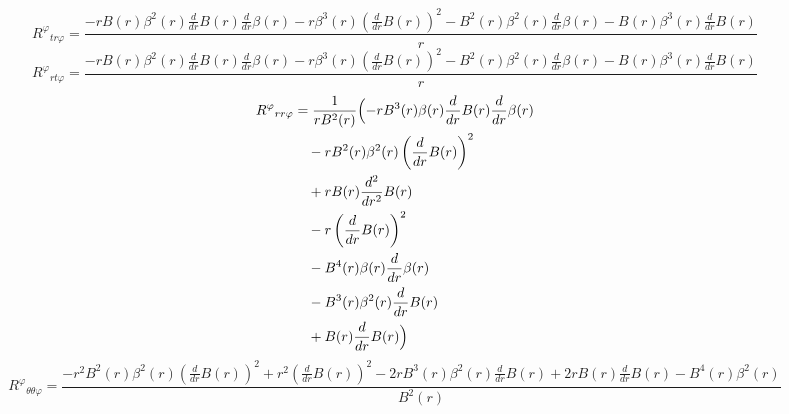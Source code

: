 \documentclass[11pt,a4paper]{article}
\newcommand{\riemann}[4]{R^{#1}{}_{#2 #3 #4}}
\begin{document}
\begin{dmath*}
  \riemann{\varphi}{t}{r}{\varphi} = \frac{- r B{\left(r \right)} \beta^{2}{\left(r \right)} \frac{d}{d r} B{\left(r \right)} \frac{d}{d r} \beta{\left(r \right)} - r \beta^{3}{\left(r \right)} \left(\frac{d}{d r} B{\left(r \right)}\right)^{2} - B^{2}{\left(r \right)} \beta^{2}{\left(r \right)} \frac{d}{d r} \beta{\left(r \right)} - B{\left(r \right)} \beta^{3}{\left(r \right)} \frac{d}{d r} B{\left(r \right)}}{r}
\end{dmath*}
\begin{dmath*}
  \riemann{\varphi}{r}{t}{\varphi} = \frac{- r B{\left(r \right)} \beta^{2}{\left(r \right)} \frac{d}{d r} B{\left(r \right)} \frac{d}{d r} \beta{\left(r \right)} - r \beta^{3}{\left(r \right)} \left(\frac{d}{d r} B{\left(r \right)}\right)^{2} - B^{2}{\left(r \right)} \beta^{2}{\left(r \right)} \frac{d}{d r} \beta{\left(r \right)} - B{\left(r \right)} \beta^{3}{\left(r \right)} \frac{d}{d r} B{\left(r \right)}}{r}
\end{dmath*}
\begin{align*}
  \riemann{\varphi}{r}{r}{\varphi} &= \frac{1}{r B^{2}{\left(r \right)}}\Bigl(- r B^{3}{\left(r \right)} \beta{\left(r \right)} \frac{d}{d r} B{\left(r \right)} \frac{d}{d r} \beta{\left(r \right)} \\
  &\quad - r B^{2}{\left(r \right)} \beta^{2}{\left(r \right)} \left(\frac{d}{d r} B{\left(r \right)}\right)^{2} \\
  &\quad + r B{\left(r \right)} \frac{d^{2}}{d r^{2}} B{\left(r \right)} \\
  &\quad - r \left(\frac{d}{d r} B{\left(r \right)}\right)^{2} \\
  &\quad - B^{4}{\left(r \right)} \beta{\left(r \right)} \frac{d}{d r} \beta{\left(r \right)} \\
  &\quad - B^{3}{\left(r \right)} \beta^{2}{\left(r \right)} \frac{d}{d r} B{\left(r \right)} \\
  &\quad + B{\left(r \right)} \frac{d}{d r} B{\left(r \right)}\Bigr)
\end{align*}
\begin{dmath*}
  \riemann{\varphi}{\theta}{\theta}{\varphi} = \frac{- r^{2} B^{2}{\left(r \right)} \beta^{2}{\left(r \right)} \left(\frac{d}{d r} B{\left(r \right)}\right)^{2} + r^{2} \left(\frac{d}{d r} B{\left(r \right)}\right)^{2} - 2 r B^{3}{\left(r \right)} \beta^{2}{\left(r \right)} \frac{d}{d r} B{\left(r \right)} + 2 r B{\left(r \right)} \frac{d}{d r} B{\left(r \right)} - B^{4}{\left(r \right)} \beta^{2}{\left(r \right)}}{B^{2}{\left(r \right)}}
\end{dmath*}
\end{document}
